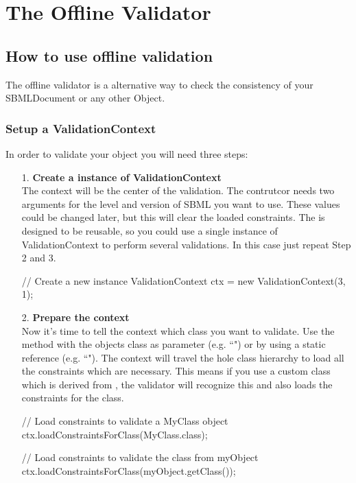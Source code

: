 \section[Offline Validation]{The Offline Validator}
\subsection{How to use offline validation}

The offline validator is a alternative way to check the consistency of your SBMLDocument or any other Object.
\subsubsection{Setup a ValidationContext}
In order to validate your object you will need three steps:
\begin{itemize}
\item[1.] \textbf{Create a instance of ValidationContext} \\
The context will be the center of the validation. The contrutcor needs two arguments for the level and version of SBML you want to use. These values could be changed later, but this will clear the loaded constraints. The  is designed to be reusable, so you could use a single instance of ValidationContext to perform several validations. In this case just repeat Step 2 and 3.
\begin{example}[style=java, title={Setup a ValidationContext}]
	// Create a new instance
	ValidationContext ctx = new ValidationContext(3, 1);
\end{example}
\item[2.] \textbf{Prepare the context} \\
Now it's time to tell the context which class you want to validate. Use the method  with the objects class as parameter (e.g. ``") or by using a static reference (e.g. ``"). The context will travel the hole class hierarchy to load all the constraints which are necessary. This means if you use a custom class which is derived from \Species, the validator will recognize this and also loads the constraints for the \Species class.
\begin{example}[style=java, title={Three different ways to load constraints}]
	// Load constraints to validate a MyClass object
	ctx.loadConstraintsForClass(MyClass.class);	
	
	// Load constraints to validate the class from myObject
	ctx.loadConstraintsForClass(myObject.getClass());
	

\end{example}
\end{itemize}
